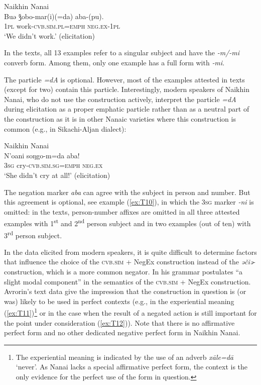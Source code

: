 \documentclass[output=paper,colorlinks,citecolor=brown]{langscibook}
\begin{document}
\ea Naikhin Nanai \label{ex:T9}\\
	\gll Buə	ǯobo-mar(i)(=da)	aba-(pu).\\
	\textsc{1pl}	work-\textsc{cvb.sim.pl=emph}	\textsc{neg.ex-1pl}\\
	\glt `We didn’t work.' (elicitation)
\z

In the texts, all 13 examples refer to a singular subject and have the \textit{-m/-mi} converb form. Among them, only one example has a full form with \textit{‑mi}.

The particle \textit{=dA} is optional. However, most of the examples attested in texts (except for two) contain this particle. Interestingly, modern speakers of Naikhin Nanai, who do not use the construction actively, interpret the particle \textit{=dA} during elicitation as a proper emphatic particle rather than as a neutral part of the construction as it is in other Nanaic varieties where this construction is common (e.g., in Sikachi-Aljan dialect):

\newpage
\ea Naikhin Nanai \label{ex:T10}\\
	\gll N’oani	soŋgo-m=da	aba!\\
	\textsc{3sg}	cry-\textsc{cvb.sim.sg=emph}	\textsc{neg.ex}\\
	\glt `She didn’t cry at all!' (elicitation)
\z

The negation marker \textit{aba} can agree with the subject in person and number. But this agreement is optional, see example (\ref{ex:T10}), in which the \textsc{3sg} marker \textit{-ni} is omitted: in the texts, person-number affixes are omitted in all three attested examples with 1\textsuperscript{st} and 2\textsuperscript{nd} person subject and in two examples (out of ten) with 3\textsuperscript{rd} person subject.

In the data elicited from modern speakers, it is quite difficult to determine factors that influence the choice of the \textsc{cvb.sim} + NegEx construction instead of the \textit{əčiə}-construction, which is a more common negator. In his grammar \citet[108]{avrorin1961a} postulates “a slight modal component” in the semantics of the \textsc{cvb.sim} + NegEx construction. Avrorin’s text data give the impression that the construction in question is (or was) likely to be used in perfect contexts (e.g., in the experiential meaning (\ref{ex:T11})\footnote{The experiential meaning is indicated by the use of an adverb \textit{xāle=dā} ‘never’. As Nanai lacks a special affirmative perfect form, the context is the only evidence for the perfect use of the form in question.} or in the case when the result of a negated action is still important for the point under consideration (\ref{ex:T12})). Note that there is no affirmative perfect form and no other dedicated negative perfect form in Naikhin Nanai.
\end{document}
